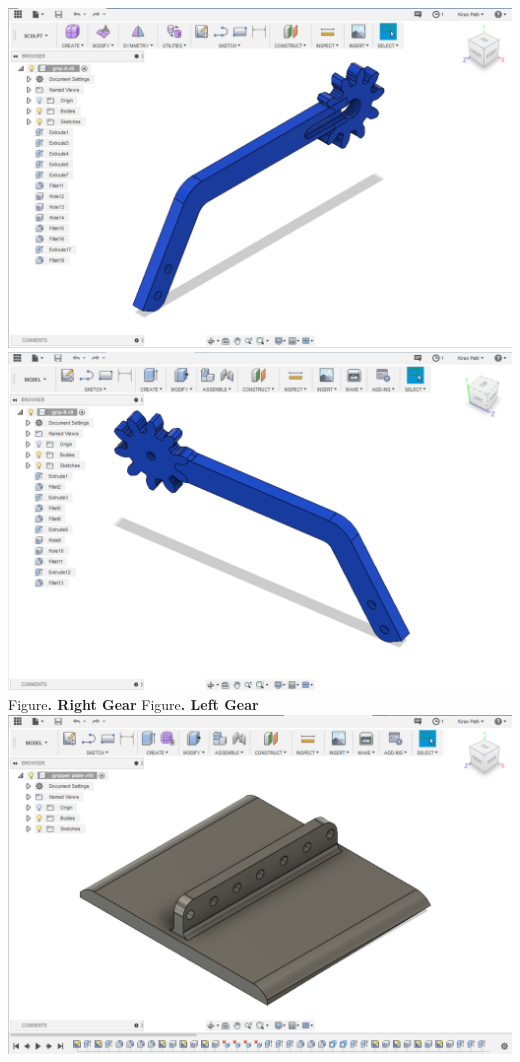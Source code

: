 \documentclass[a4paper,12pt,oneside]{book}
\begin{document}
\begin{center}
\includegraphics[scale=0.2]{gear1.png}\includegraphics[scale=0.2]{gear2.png}\\
\small{Figure\textbf{. Right Gear} \hspace{5 em}Figure\textbf{. Left Gear}}
\includegraphics[scale=0.2]{gripplate.png}

\end{center}
\end{document}

